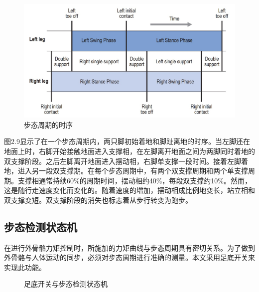 \begin{figure}[htb]
    \includegraphics[width=15cm]{fig/f30.jpg}
    \caption{步态周期的时序\cite{p44}}
    \label{fig:mark}
\end{figure}

图2.9显示了在一个步态周期内，两只脚初始着地和脚趾离地的时序。当左脚还在地面上时，右脚开始接触地面进入支撑相，在左脚离开地面之间为两脚同时着地的双支撑阶段。之后左脚离开地面进入摆动相，右脚单支撑一段时间。接着左脚着地，进入另一段双支撑期。在每个步态周期中，有两个双支撑周期和两个单支撑周期。支撑相通常持续60\%的周期时间，摆动相约40\%，每段双支撑约10\%。然而，这是随行走速度变化而变化的。随着速度的增加，摆动相成比例地变长，站立相和双支撑变短。双支撑阶段的消失也标志着从步行转变为跑步。

\subsection{步态检测状态机}

在进行外骨骼力矩控制时，所施加的力矩曲线与步态周期具有密切关系。为了做到外骨骼与人体运动的同步，必须对步态周期进行准确的测量。本文采用足底开关来实现此功能。
\begin{figure}[!htb]
    \quad
    \caption{足底开关与步态检测状态机}
    \label{fig:subfigss}
\end{figure}

